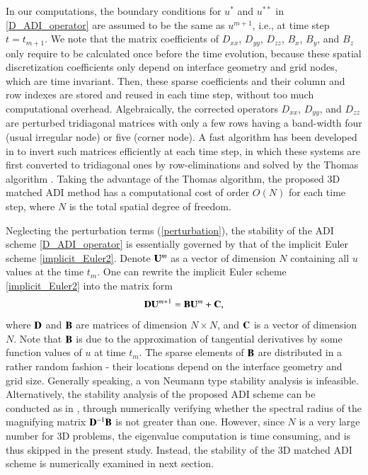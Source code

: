 \documentclass[dissertation]{uathesis}
\begin{document}
\begin{body}
\begin{flushleft}
\hspace{1cm} In our computations, the boundary conditions for $u^*$ and $u^{**}$ in \eqref{D_ADI_operator} are assumed to be the same as $u^{m+1}$, i.e., at time step $t=t_{m+1}$. 
We note that the matrix coefficients of $D_{xx}$, $D_{yy}$,  $D_{zz}$, $B_{x}$, $B_{y}$, and $B_{z}$ 
only require to be calculated once before the time evolution, because these spatial discretization coefficients
only depend on interface geometry and grid nodes, which are time invariant. 
Then, these sparse coefficients and their column and row indexes are stored and reused in each time step,
without too much computational overhead. 
Algebraically, the corrected operators $D_{xx}$, $D_{yy}$, and $D_{zz}$ are perturbed tridiagonal matrices
with only a few rows having a band-width four (usual irregular node) or five (corner node). 
A fast algorithm has been developed in \cite{zhao2015matched} to invert such matrices efficiently at each time step,
in which 
these systems are first converted to tridiagonal ones by row-eliminations and solved by the Thomas algorithm \cite{strikwerda2004}. 
Taking the advantage of the Thomas algorithm, the proposed 3D matched ADI method has a computational cost of order $O(N)$ for each time step, where $N$ is the total spatial degree of freedom.


\hspace{1cm} Neglecting the perturbation terms (\ref{perturbation}), the stability of the ADI scheme \eqref{D_ADI_operator} is essentially governed by that of the implicit Euler scheme \eqref{implicit_Euler2}. Denote ${\bf U}^m$ as a vector of dimension $N$ containing all $u$ values at the time $t_m$. One can rewrite  the implicit Euler scheme \eqref{implicit_Euler2} into the matrix form
\begin{equation}
{\bf D} {\bf U}^{m+1} = {\bf B} {\bf U}^m + {\bf C},
\end{equation}
where ${\bf D}$ and ${\bf B}$ are matrices of dimension $N \times N$, and ${\bf C}$ is a vector of dimension $N$. 
Note that ${\bf B}$ is due to the approximation of tangential
derivatives by some function values of $u$ at time $t_m$. The sparse elements of ${\bf B}$ are distributed
in a rather random fashion - their locations depend on the interface geometry and grid size. 
Generally speaking, a von Neumann type stability analysis is infeasible. 
Alternatively, the stability analysis of the proposed ADI scheme can be conducted as in \cite{zhao2015matched},
through numerically verifying whether the spectral radius of the magnifying matrix ${\bf D}^{-1} {\bf B}$ is not greater than one. 
However, since $N$ is a very large number for 3D problems, the eigenvalue computation is time consuming, and is thus skipped in the present study. 
Instead, the stability of the 3D matched ADI scheme is numerically examined in next section.  


\end{flushleft}
\end{body}
\end{document}
